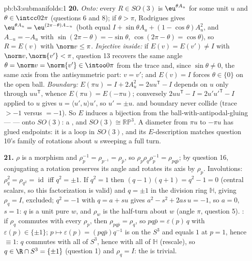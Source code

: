 \begin{solution}{pb:b3:submanifolds:1}
\textbf{20.} \emph{Onto:} every $R \in SO(3)$ is
$\eu^{\theta A_u}$ for some unit $u$ and $\theta \in
\intcc0{2\pi}$ (questions 6 and 8); if $\theta > \pi$,
Rodrigues gives $\eu^{\theta A_u} = \eu^{(2\pi -
\theta)A_{-u}}$ (both equal $I + \sin\theta A_u + (1 -
\cos\theta)A_u^2$, and $A_{-u} = -A_u$ with $\sin(2\pi -
\theta) = -\sin\theta$, $\cos(2\pi - \theta) =
\cos\theta$), so $R = E(v)$ with $\norm v \leq \pi$.
\emph{Injective inside:} if $E(v) = E(v') \neq I$ with
$\norm v, \norm{v'} < \pi$, question 13 recovers the same
angle $\theta = \norm v = \norm{v'} \in \intoo0\pi$ from
the trace and, since $\sin\theta \neq 0$, the same axis
from the antisymmetric part: $v = v'$; and $E(v) = I$
forces $\theta \in \{0\}$ on the open ball. \emph{Boundary:}
$E(\pi u) = I + 2A_u^2 = 2uu^{\mathsf T} - I$ depends on
$u$ only through $uu^{\mathsf T}$, whence $E(\pi u) =
E(-\pi u)$; conversely $2uu^{\mathsf T} - I =
2u'u'^{\mathsf T} - I$ applied to $u$ gives $u = \langle
u', u\rangle u'$, so $u' = \pm u$.  and boundary
never collide (trace $> -1$ versus $= -1$). So $E$ induces
a  bijection from the ball-with-antipodal-gluing
---  --- onto $SO(3)$: a , and $SO(3)
\cong \mathbb{RP}^3$. A diameter from $\pi u$ to $-\pi u$
has glued endpoints: it is a loop in $SO(3)$, and its
$E$-description matches question 10's family of rotations
about $u$ sweeping a full turn.

\textbf{21.} $\rho$ is a morphism and $\rho_p^{-1} =
\rho_{p^{-1}} = \rho_{\bar p}$, so $\rho_p\rho_q\rho_p^{-1}
= \rho_{pq\bar p}$; by question 16, conjugating a rotation
preserves its angle and rotates its axis by $\rho_p$.
Involutions: $\rho_q^2 = \rho_{q^2} = \operatorname{id}$
iff $q^2 = \pm1$. If $q^2 = 1$ then $(q - 1)(q + 1) = q^2 -
1 = 0$ (central scalars, so this factorization is valid) and
$q = \pm1$ in the division ring $\mathbb H$, giving $\rho_q
= I$, excluded; $q^2 = -1$ with $q = a +
su$ gives $a^2 - s^2 + 2as\,u = -1$, so $a = 0$, $s = 1$:
$q$ is a unit pure $w$, and $\rho_w$ is the half-turn about
$w$ (angle $\pi$, question 5). : if $\rho_q$ commutes
with every $\rho_p$, then $\rho_{pq\bar p} = \rho_q$, so
$pq\bar p = \varepsilon(p)\,q$ with $\varepsilon(p) \in
\{\pm1\}$; $p \mapsto \varepsilon(p) = (pq\bar p)q^{-1}$ is
 on the  $S^3$ and equals $1$ at $p =
1$, hence $\equiv 1$: $q$ commutes with all of $S^3$, hence
with all of $\mathbb H$ (rescale), so $q \in \R \cap S^3 =
\{\pm1\}$ (question 1) and $\rho_q = I$: the  is
trivial.


\end{solution}

